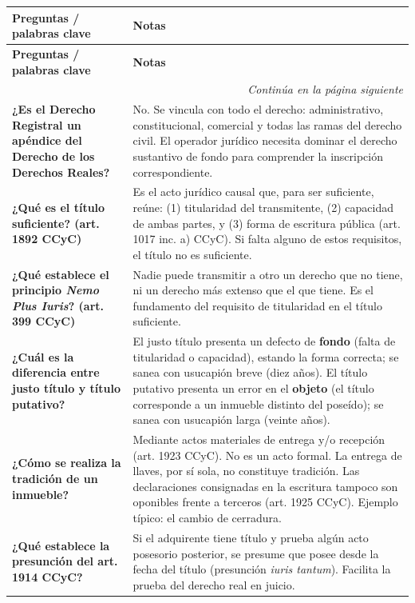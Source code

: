 \documentclass[12pt,oneside]{book}
\begin{document}
\begin{longtable}{@{}p{4.3cm}p{9.4cm}@{}}
\toprule
\textbf{Preguntas / palabras clave} & \textbf{Notas} \\
\midrule
\endfirsthead
\toprule
\textbf{Preguntas / palabras clave} & \textbf{Notas} \\
\midrule
\endhead
\midrule
\multicolumn{2}{r}{\textit{Continúa en la página siguiente}} \\
\endfoot
\bottomrule
\endlastfoot

\textbf{¿Es el Derecho Registral un apéndice del Derecho de los Derechos Reales?} &
No. Se vincula con todo el derecho: administrativo, constitucional, comercial y todas las ramas del derecho civil. El operador jurídico necesita dominar el derecho sustantivo de fondo para comprender la inscripción correspondiente. \\[0.4em]

\textbf{¿Qué es el título suficiente? (art. 1892 CCyC)} &
Es el acto jurídico causal que, para ser suficiente, reúne: (1) titularidad del transmitente, (2) capacidad de ambas partes, y (3) forma de escritura pública (art. 1017 inc. a) CCyC). Si falta alguno de estos requisitos, el título no es suficiente. \\[0.4em]

\textbf{¿Qué establece el principio \textit{Nemo Plus Iuris}? (art. 399 CCyC)} &
Nadie puede transmitir a otro un derecho que no tiene, ni un derecho más extenso que el que tiene. Es el fundamento del requisito de titularidad en el título suficiente. \\[0.4em]

\textbf{¿Cuál es la diferencia entre justo título y título putativo?} &
El justo título presenta un defecto de \textbf{fondo} (falta de titularidad o capacidad), estando la forma correcta; se sanea con usucapión breve (diez años). El título putativo presenta un error en el \textbf{objeto} (el título corresponde a un inmueble distinto del poseído); se sanea con usucapión larga (veinte años). \\[0.4em]

\textbf{¿Cómo se realiza la tradición de un inmueble?} &
Mediante actos materiales de entrega y/o recepción (art. 1923 CCyC). No es un acto formal. La entrega de llaves, por sí sola, no constituye tradición. Las declaraciones consignadas en la escritura tampoco son oponibles frente a terceros (art. 1925 CCyC). Ejemplo típico: el cambio de cerradura. \\[0.4em]

\textbf{¿Qué establece la presunción del art. 1914 CCyC?} &
Si el adquirente tiene título y prueba algún acto posesorio posterior, se presume que posee desde la fecha del título (presunción \textit{iuris tantum}). Facilita la prueba del derecho real en juicio. \\[0.4em]


\end{longtable}
\end{document}
